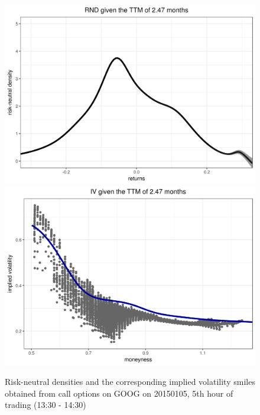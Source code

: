 \documentclass[a4paper,12pt]{article}
\theoremstyle{plain}
\theoremstyle{definition}
\begin{document}
\begin{figure}[H]
\begin{center}
 \endminipage\\
 \includegraphics[width=\linewidth]{figures/hour_5th/GOOG_20150105_rnd_ci_5th_hour_ttm_2_47.png}
 \endminipage
 \hspace{3mm}
 \includegraphics[width=\linewidth]{figures/hour_5th/GOOG_20150105_iv_smile_5th_hour_ttm_2_47.png}
 \endminipage
\end{center}
\vspace{-3mm}
\caption{\footnotesize Risk-neutral densities and the corresponding implied volatility smiles obtained from call options on GOOG on 20150105, 5th hour of trading (13:30 - 14:30)} 
\label{rnd3}
\end{figure}

\newpage
\end{document}
